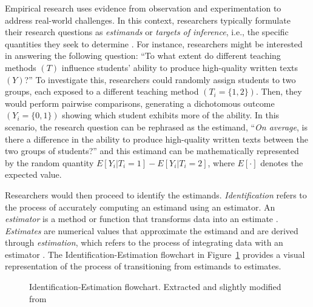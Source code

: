 \documentclass[
  authoryear,
  review,
  1p]{elsarticle}
\begin{document}
Empirical research uses evidence from observation and experimentation to
address real-world challenges. In this context, researchers typically
formulate their research questions as \emph{estimands} or \emph{targets
of inference}, i.e., the specific quantities they seek to determine
\citep{Everitt_et_al_2010}. For instance, researchers might be
interested in answering the following question: ``To what extent do
different teaching methods \((T)\) influence students' ability to
produce high-quality written texts \((Y)\)?'' To investigate this,
researchers could randomly assign students to two groups, each exposed
to a different teaching method \((T_{i} = \{1,2\})\). Then, they would
perform pairwise comparisons, generating a dichotomous outcome
\((Y_{i} = \{0,1\})\) showing which student exhibits more of the
ability. In this scenario, the research question can be rephrased as the
estimand, ``\emph{On average}, is there a difference in the ability to
produce high-quality written texts between the two groups of students?''
and this estimand can be mathematically represented by the random
quantity \(E[Y_{i}| T_{i}=1] - E[Y_{i}| T_{i}=2]\), where \(E[\cdot]\)
denotes the expected value.

Researchers would then proceed to identify the estimands.
\emph{Identification} refers to the process of accurately computing an
estimand using an estimator. An \emph{estimator} is a method or function
that transforms data into an estimate \citep{Neal_2020}.
\emph{Estimates} are numerical values that approximate the estimand and
are derived through \emph{estimation}, which refers to the process of
integrating data with an estimator \citep{Everitt_et_al_2010}. The
Identification-Estimation flowchart \citep{McElreath_2020, Neal_2020} in
Figure~\ref{fig-IEflow} provides a visual representation of the process
of transitioning from estimands to estimates.

\begin{figure}


\caption{\label{fig-IEflow}Identification-Estimation flowchart.
Extracted and slightly modified from \citet[pp.~32]{Neal_2020}}

\end{figure}%
\end{document}
